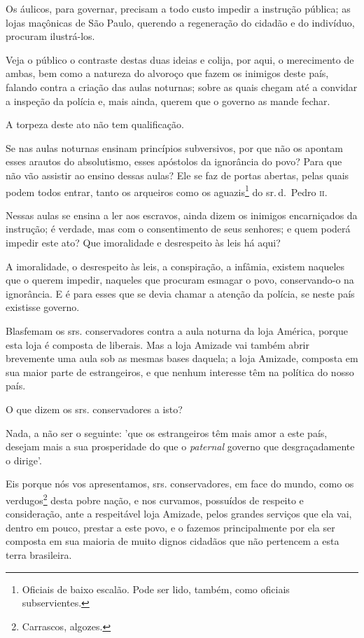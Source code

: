 Os áulicos, para governar, precisam a todo custo impedir a instrução
pública; as lojas maçônicas de São Paulo, querendo a regeneração do
cidadão e do indivíduo, procuram ilustrá-los.

Veja o público o contraste destas duas ideias e colija, por aqui, o
merecimento de ambas, bem como a natureza do alvoroço que fazem os
inimigos deste país, falando contra a criação das aulas noturnas; sobre
as quais chegam até a convidar a inspeção da polícia e, mais ainda,
querem que o governo as mande fechar.

A torpeza deste ato não tem qualificação.

Se nas aulas noturnas ensinam princípios subversivos, por que não os
apontam esses arautos do absolutismo, esses apóstolos da ignorância do
povo? Para que não vão assistir ao ensino dessas aulas? Ele se faz de
portas abertas, pelas quais podem todos entrar, tanto os arqueiros como
os aguazis\footnote{Oficiais de baixo escalão. Pode ser lido, também,
  como oficiais subservientes.} do sr.\,d.~Pedro \textsc{ii}.

Nessas aulas se ensina a ler aos escravos, ainda dizem os inimigos
encarniçados da instrução; é verdade, mas com o consentimento de seus
senhores; e quem poderá impedir este ato? Que imoralidade e desrespeito
às leis há aqui?

A imoralidade, o desrespeito às leis, a conspiração, a infâmia, existem
naqueles que o querem impedir, naqueles que procuram esmagar o povo,
conservando-o na ignorância. E é para esses que se devia chamar a
atenção da polícia, se neste país existisse governo.

Blasfemam os srs. conservadores contra a aula noturna da loja América,
porque esta loja é composta de liberais. Mas a loja Amizade vai também
abrir brevemente uma aula sob as mesmas bases daquela; a loja Amizade,
composta em sua maior parte de estrangeiros, e que nenhum interesse têm
na política do nosso país.

O que dizem os srs. conservadores a isto?

Nada, a não ser o seguinte: 'que os estrangeiros têm mais amor a este
país, desejam mais a sua prosperidade do que o \emph{paternal} governo
que desgraçadamente o dirige'.

Eis porque nós vos apresentamos, srs. conservadores, em face do mundo,
como os verdugos\footnote{Carrascos, algozes.} desta pobre nação, e
nos curvamos, possuídos de respeito e consideração, ante a respeitável
loja Amizade, pelos grandes serviços que ela vai, dentro em pouco,
prestar a este povo, e o fazemos principalmente por ela ser composta em
sua maioria de muito dignos cidadãos que não pertencem a esta terra
brasileira.

